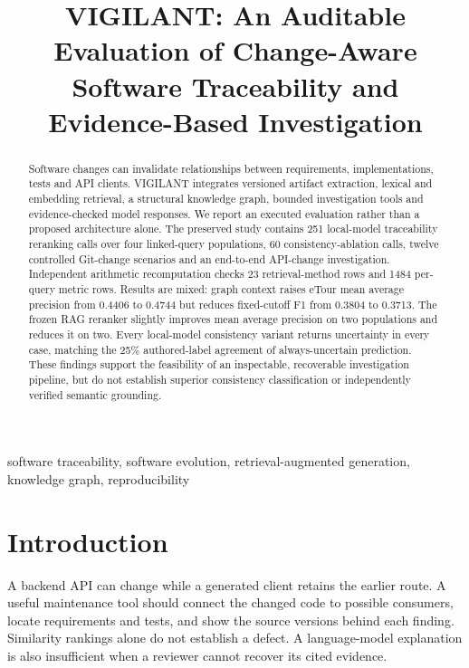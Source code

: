 \documentclass[conference,a4paper]{IEEEtran}
\begin{document}
\title{VIGILANT: An Auditable Evaluation of Change-Aware Software Traceability and Evidence-Based Investigation}
\author{}
\maketitle
\begin{abstract}
Software changes can invalidate relationships between requirements, implementations, tests and API clients. VIGILANT integrates versioned artifact extraction, lexical and embedding retrieval, a structural knowledge graph, bounded investigation tools and evidence-checked model responses. We report an executed evaluation rather than a proposed architecture alone. The preserved study contains 251 local-model traceability reranking calls over four linked-query populations, 60 consistency-ablation calls, twelve controlled Git-change scenarios and an end-to-end API-change investigation. Independent arithmetic recomputation checks 23 retrieval-method rows and 1484 per-query metric rows. Results are mixed: graph context raises eTour mean average precision from 0.4406 to 0.4744 but reduces fixed-cutoff F1 from 0.3804 to 0.3713. The frozen RAG reranker slightly improves mean average precision on two populations and reduces it on two. Every local-model consistency variant returns uncertainty in every case, matching the 25\% authored-label agreement of always-uncertain prediction. These findings support the feasibility of an inspectable, recoverable investigation pipeline, but do not establish superior consistency classification or independently verified semantic grounding.
\end{abstract}
\begin{IEEEkeywords}software traceability, software evolution, retrieval-augmented generation, knowledge graph, reproducibility\end{IEEEkeywords}

\section{Introduction}
A backend API can change while a generated client retains the earlier route. A useful maintenance tool should connect the changed code to possible consumers, locate requirements and tests, and show the source versions behind each finding. Similarity rankings alone do not establish a defect. A language-model explanation is also insufficient when a reviewer cannot recover its cited evidence.
\end{document}
